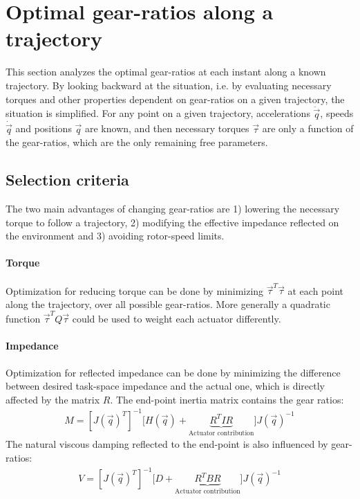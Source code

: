 
\newpage

\section{Optimal gear-ratios along a trajectory}
\label{sec:optigeartraj}

This section analyzes the optimal gear-ratios at each instant along a known trajectory. By looking backward at the situation,  i.e. by evaluating necessary torques and other properties dependent on gear-ratios on a given trajectory, the situation is simplified. For any point on a given trajectory, accelerations $\ddot{\vec{q}}$, speeds $\dot{\vec{q}}$ and positions $\vec{q}$ are known, and then necessary torques $\vec{\tau}$ are only a function of the gear-ratios, which are the only remaining free parameters.

\subsection{Selection criteria}
\label{sec:GearSelectionCriteria}

The two main advantages of changing gear-ratios are 1) lowering the necessary torque to follow a trajectory, 2) modifying the effective impedance reflected on the environment and 3) avoiding rotor-speed limits. 

\paragraph{Torque}
Optimization for reducing torque can be done by minimizing $\vec{\tau}^T \vec{\tau}$ at each point along the trajectory, over all possible gear-ratios. More generally a quadratic function $\vec{\tau}^T Q \vec{\tau}$ could be used to weight each actuator differently.

\paragraph{Impedance}
Optimization for reflected impedance can be done by minimizing the difference between desired task-space impedance and the actual one, which is directly affected by the matrix $R$. The end-point inertia matrix contains the gear ratios: 
%
\begin{align}
	M = [J(\vec{q})^T]^{-1} \big [ H( \vec{q} )  + \underbrace{ R^T I R }_{\text{Actuator contribution}}  \big ] J(\vec{q})^{-1}
 \label{eq:endpointmass}
\end{align}
%
The natural viscous damping reflected to the end-point is also influenced by gear-ratios:
\begin{align}
	V = [J(\vec{q})^T]^{-1} \big [ D + \underbrace{ R^T B R }_{\text{Actuator contribution}}  \big ] J(\vec{q})^{-1}
 \label{eq:endpointdamp}
\end{align}

